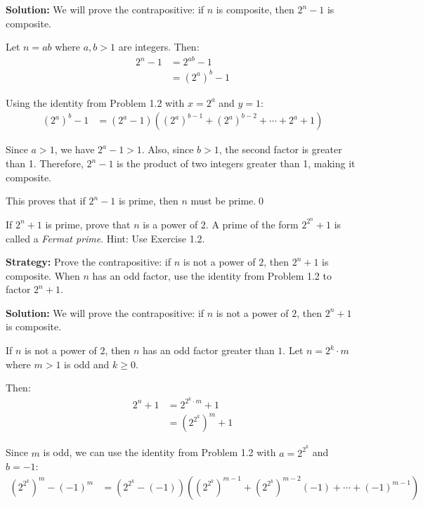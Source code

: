 \bigskip\noindent\textbf{Solution:}
We will prove the contrapositive: if $n$ is composite, then $2^n - 1$ is composite.

Let $n = ab$ where $a, b > 1$ are integers. Then:
\begin{align*}
2^n - 1 &= 2^{ab} - 1 \\
&= (2^a)^b - 1
\end{align*}

Using the identity from Problem 1.2 with $x = 2^a$ and $y = 1$:
\begin{align*}
(2^a)^b - 1 &= (2^a - 1)((2^a)^{b-1} + (2^a)^{b-2} + \cdots + 2^a + 1)
\end{align*}

Since $a > 1$, we have $2^a - 1 > 1$. Also, since $b > 1$, the second factor is greater than 1. Therefore, $2^n - 1$ is the product of two integers greater than 1, making it composite.

This proves that if $2^n - 1$ is prime, then $n$ must be prime.\qed



\begin{problembox}
\begin{problemstatement}
If $2^n + 1$ is prime, prove that $n$ is a power of $2$. A prime of the form $2^{2^n} + 1$ is called a \textit{Fermat prime}. Hint: Use Exercise 1.2.
\end{problemstatement}
\end{problembox}

\noindent\textbf{Strategy:} Prove the contrapositive: if $n$ is not a power of $2$, then $2^n + 1$ is composite. When $n$ has an odd factor, use the identity from Problem 1.2 to factor $2^n + 1$.

\bigskip\noindent\textbf{Solution:}
We will prove the contrapositive: if $n$ is not a power of $2$, then $2^n + 1$ is composite.

If $n$ is not a power of $2$, then $n$ has an odd factor greater than $1$. Let $n = 2^k \cdot m$ where $m > 1$ is odd and $k \geq 0$.

Then:
\begin{align*}
2^n + 1 &= 2^{2^k \cdot m} + 1 \\
&= (2^{2^k})^m + 1
\end{align*}

Since $m$ is odd, we can use the identity from Problem 1.2 with $a = 2^{2^k}$ and $b = -1$:
\begin{align*}
(2^{2^k})^m - (-1)^m &= (2^{2^k} - (-1))((2^{2^k})^{m-1} + (2^{2^k})^{m-2}(-1) + \cdots + (-1)^{m-1})
\end{align*}

